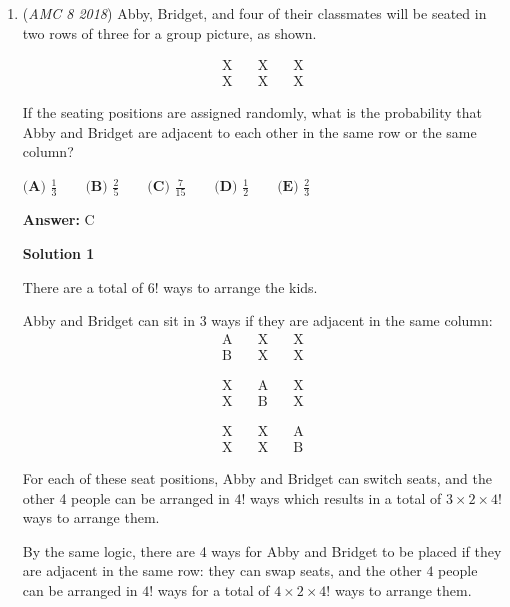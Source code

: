 \begin{enumerate}
 


	\item (\textit{AMC 8 2018}) Abby, Bridget, and four of their classmates will be seated in two rows of three for a group picture, as shown.


 
 \begin{eqnarray*} \text{X}&\quad\text{X}\quad&\text{X} \\ \text{X}&\quad\text{X}\quad&\text{X}  \end{eqnarray*}


 If the seating positions are assigned randomly, what is the probability that Abby and Bridget are adjacent to each other in the same row or the same column?


 $\textbf{(A) } \frac{1}{3} \qquad \textbf{(B) } \frac{2}{5} \qquad \textbf{(C) } \frac{7}{15} \qquad \textbf{(D) } \frac{1}{2} \qquad \textbf{(E) } \frac{2}{3}$

 \textbf{Answer: }C



\textbf{Solution 1}

There are a total of $6 !$ ways to arrange the kids.

 Abby and Bridget can sit in 3 ways if they are adjacent in the same column:
 \begin{eqnarray*} \text{A}&\quad\text{X}\quad&\text{X} \\ \text{B}&\quad\text{X}\quad&\text{X}  \end{eqnarray*}

 \begin{eqnarray*} \text{X}&\quad\text{A}\quad&\text{X} \\ \text{X}&\quad\text{B}\quad&\text{X}  \end{eqnarray*}

 \begin{eqnarray*} \text{X}&\quad\text{X}\quad&\text{A} \\ \text{X}&\quad\text{X}\quad&\text{B}  \end{eqnarray*}

 
For each of these seat positions, Abby and Bridget can switch seats, and the other 4 people can be arranged in $4!$ ways which results in a total of $3 \times 2 \times 4!$ ways to arrange them. 

 
By the same logic, there are 4 ways for Abby and Bridget to be placed if they are adjacent in the same row: they can swap seats, and the other $4$ people can be arranged in $4!$ ways for a total of $4 \times 2 \times 4!$ ways to arrange them.


\end{enumerate}
